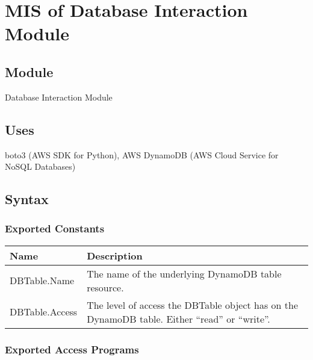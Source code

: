 \documentclass[12pt, titlepage]{article}
\begin{document}
\section{MIS of Database Interaction Module}
\label{sec:DI}

\subsection{Module}

Database Interaction Module

\subsection{Uses}

boto3 (AWS SDK for Python), AWS DynamoDB (AWS Cloud Service for NoSQL Databases)

\subsection{Syntax}

\subsubsection{Exported Constants}

\begin{center}
  \begin{tabular}{p{4cm} p{12cm}}
    \hline
    \textbf{Name} & \textbf{Description} \\
    \hline
    DBTable.Name & The name of the underlying DynamoDB table resource. \\
    \hline
    DBTable.Access & The level of access the DBTable object has on
    the DynamoDB table. Either ``read'' or ``write''. \\
    \hline
  \end{tabular}
\end{center}

\subsubsection{Exported Access Programs}
\end{document}
